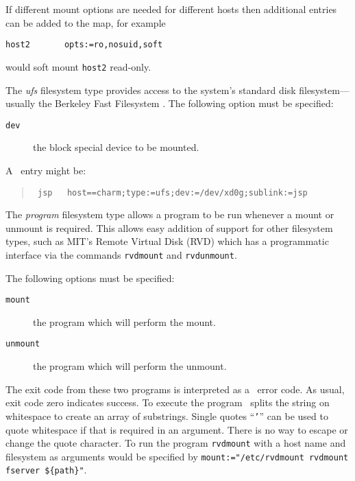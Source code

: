 If different mount options are needed for different hosts then additional
entries can be added to the map, for example
\begin{verbatim}
host2       opts:=ro,nosuid,soft
\end{verbatim}
would soft mount {\tt host2} read-only.


The {\em ufs} filesystem type provides access to the system's
standard disk filesystem---usually the Berkeley Fast Filesystem \cite{bsd:ufs}.
The following option must be specified:
\begin{description}
\item[\tt dev]
the block special device to be mounted.
\end{description}

A \UFS\ entry might be:
\begin{quote}
\tt
jsp\ \ \ host==charm;type:=ufs;dev:=/dev/xd0g;sublink:=jsp
\end{quote}

\label{pfs}

The {\em program} filesystem type allows a program to be run
whenever a mount or unmount is required.  This allows easy
addition of support for other filesystem types, such as MIT's
Remote Virtual Disk (RVD) \cite{mit:rvd} which has a programmatic interface via
the commands {\tt rvdmount} and {\tt rvdunmount}.

The following options must be specified:
\begin{description}
\item[\tt mount]
the program which will perform the mount.

\item[\tt unmount]
the program which will perform the unmount.
\end{description}

The exit code from these two programs is interpreted as a \Unix\ error
code.  As usual, exit code zero indicates success.
To execute the program \amd\ splits the string on whitespace to
create an array of substrings.
Single quotes ``{\tt '}'' can be used to quote whitespace if that is
required in an argument.  There is no way to escape or change the quote character.
To run the program {\tt rvdmount} with a host name and filesystem as
arguments would be specified by {\tt mount:="/etc/rvdmount rvdmount fserver \$\{path\}"}.

